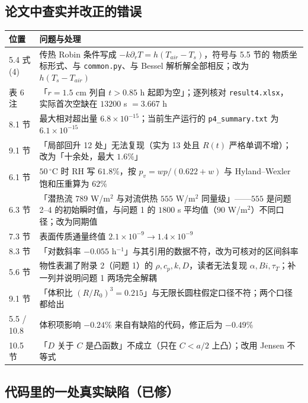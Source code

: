 \documentclass[11pt,a4paper]{ctexart}
\newcommand{\src}[1]{\texttt{#1}}
\begin{document}
\subsection{论文中查实并改正的错误}

\begin{center}
\small
\begin{tabular}{p{}p{}}
\toprule
位置 & 问题与处理 \\
\midrule
5.4 式 (4) & 传热 Robin 条件写成 $-k\partial_rT=h(T_{air}-T_s)$，符号与 5.5 节的
物质坐标形式、与 \src{common.py}、与 Bessel 解析解全部相反；改为 $h(T_s-T_{air})$ \\
表 6 注 & 「$r=1.5$ cm 列自 $t>0.85$ h 起即为空」；逐列核对 \src{result4.xlsx}，
实际首次空缺在 $13200$ s $=3.667$ h \\
8.1 节 & 最大相对超出量 $6.8\times10^{-15}$；当前生产运行的 \src{p4\_summary.txt}
为 $6.1\times10^{-15}$ \\
9.1 节 & 「局部回升 12 处」无法复现（实为 13 处且 $R(t)$ 严格单调不增）；
改为「十余处，最大 $1.6\%$」 \\
6.1 节 & $50\,^\circ$C 时 RH 写 $61.8\%$，按 $p_v=wp/(0.622+w)$ 与
Hyland--Wexler 饱和压重算为 $62\%$ \\
6.3 节 & 「潜热流 $789$ W/m$^2$ 与对流供热 $555$ W/m$^2$ 同量级」——$555$ 是问题 2--4
的初始瞬时值，与问题 1 的 $1800$ s 平均值（$90$ W/m$^2$）不同口径；改为同期值 \\
7.3 节 & 表面传质通量终值 $2.1\times10^{-9}\to1.4\times10^{-9}$ \\
8.3 节 & 「对数斜率 $-0.055$ h$^{-1}$」与其引用的数据不符，改为可核对的区间斜率 \\
5.6 节 & 物性表漏了附录 2（问题 1）的 $\rho,c_p,k,D$，读者无法复现
$\alpha,Bi,\tau_T$；补一列并说明问题 1 两场完全解耦 \\
9.1 节 & 「体积比 $(R/R_0)^3=0.215$」与无限长圆柱假定口径不符；两个口径都给出 \\
5.5 / 10.8 & 体积项影响 $-0.24\%$ 来自有缺陷的代码，修正后为 $-0.49\%$ \\
10.5 节 & 「$D$ 关于 $C$ 是凸函数」不成立（只在 $C<a/2$ 上凸）；改用 Jensen 不等式 \\
\bottomrule
\end{tabular}
\end{center}

\subsection{代码里的一处真实缺陷（已修）}
\end{document}
